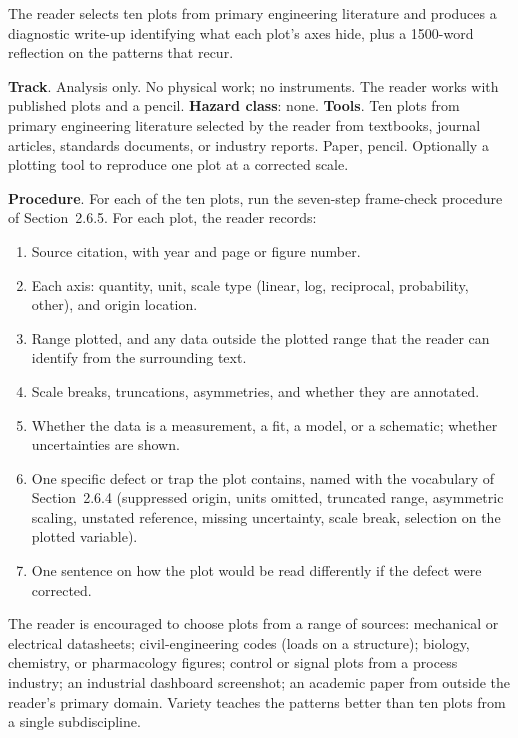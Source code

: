 \begin{project}
The reader selects ten plots from primary engineering literature
and produces a diagnostic write-up identifying what each plot's axes
hide, plus a 1500-word reflection on the patterns that recur.

\textbf{Track}. Analysis only. No physical work; no instruments. The
reader works with published plots and a pencil.
\textbf{Hazard class}: none.
\textbf{Tools}. Ten plots from primary engineering literature
selected by the reader from textbooks, journal articles, standards
documents, or industry reports. Paper, pencil. Optionally a plotting
tool to reproduce one plot at a corrected scale.

\textbf{Procedure}. For each of the ten plots, run the seven-step
frame-check procedure of Section~2.6.5. For each plot, the reader
records:

\begin{enumerate}[leftmargin=*]
  \item Source citation, with year and page or figure number.
  \item Each axis: quantity, unit, scale type (linear, log,
    reciprocal, probability, other), and origin location.
  \item Range plotted, and any data outside the plotted range that
    the reader can identify from the surrounding text.
  \item Scale breaks, truncations, asymmetries, and whether they are
    annotated.
  \item Whether the data is a measurement, a fit, a model, or a
    schematic; whether uncertainties are shown.
  \item One specific defect or trap the plot contains, named with
    the vocabulary of Section~2.6.4 (suppressed origin, units omitted,
    truncated range, asymmetric scaling, unstated reference, missing
    uncertainty, scale break, selection on the plotted variable).
  \item One sentence on how the plot would be read differently if the
    defect were corrected.
\end{enumerate}

The reader is encouraged to choose plots from a range of sources:
mechanical or electrical datasheets; civil-engineering codes (loads
on a structure); biology, chemistry, or pharmacology figures; control
or signal plots from a process industry; an industrial dashboard
screenshot; an academic paper from outside the reader's primary
domain. Variety teaches the patterns better than ten plots from a
single subdiscipline.


\end{project}
